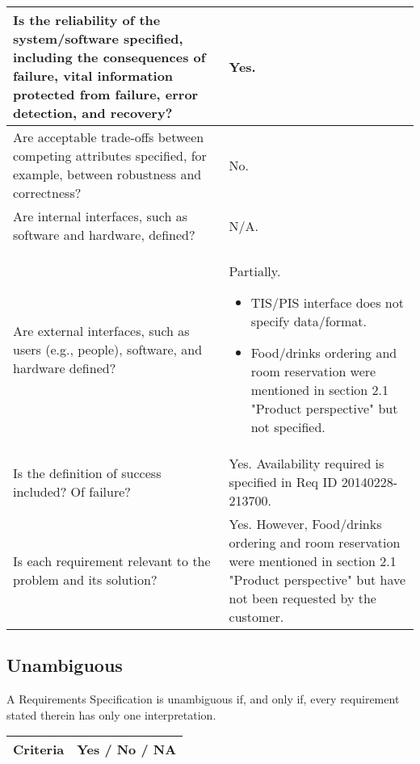 \documentclass[Main]{subfiles}
\begin{document}
\begin{longtable}{p{8cm} | p{7.3cm}}
Is the reliability of the system/software specified, including the consequences of failure, vital information protected from failure, error detection, and recovery? & Yes. \\ \hline

Are acceptable trade-offs between competing attributes specified, for example, between robustness and correctness? & No. \\ \hline

Are internal interfaces, such as software and hardware, defined? & N/A. \\ \hline

Are external interfaces, such as users (e.g., people), software, and hardware defined? & Partially. \begin{itemize}
\item TIS/PIS interface does not specify data/format.
\item Food/drinks ordering and room reservation were mentioned in section 2.1 "Product perspective" but not specified.
\end{itemize} \\ \hline

Is the definition of success included? Of failure? & Yes. Availability required is specified in Req ID 20140228-213700. \\ \hline

Is each requirement relevant to the problem and its solution? & Yes. However, Food/drinks ordering and room reservation were mentioned in section 2.1 "Product perspective" but have not been requested by the customer. \\ \hline

\end{longtable}

\subsection{Unambiguous}
A Requirements Specification is unambiguous if, and only if, every requirement stated therein has only one interpretation.

\begin{longtable}{p{8cm} | p{7.3cm}}
\textbf{Criteria} & \textbf{Yes / No / NA} \\ \hline



\end{longtable}
\end{document}
